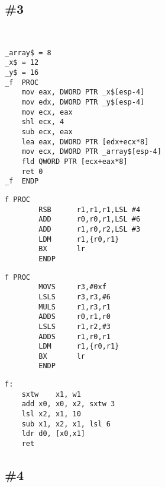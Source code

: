 \subsection{\Exercise \#3}
\label{exercise_array_3}

\WhatThisCodeDoes\


\begin{lstlisting}[caption=\Optimizing MSVC 2010]
_array$ = 8
_x$ = 12
_y$ = 16
_f	PROC
	mov	eax, DWORD PTR _x$[esp-4]
	mov	edx, DWORD PTR _y$[esp-4]
	mov	ecx, eax
	shl	ecx, 4
	sub	ecx, eax
	lea	eax, DWORD PTR [edx+ecx*8]
	mov	ecx, DWORD PTR _array$[esp-4]
	fld	QWORD PTR [ecx+eax*8]
	ret	0
_f	ENDP
\end{lstlisting}

\begin{lstlisting}[caption=\NonOptimizingKeilVI (\ARMMode)]
f PROC
        RSB      r1,r1,r1,LSL #4
        ADD      r0,r0,r1,LSL #6
        ADD      r1,r0,r2,LSL #3
        LDM      r1,{r0,r1}
        BX       lr
        ENDP
\end{lstlisting}

\begin{lstlisting}[caption=\NonOptimizingKeilVI (\ThumbMode)]
f PROC
        MOVS     r3,#0xf
        LSLS     r3,r3,#6
        MULS     r1,r3,r1
        ADDS     r0,r1,r0
        LSLS     r1,r2,#3
        ADDS     r1,r0,r1
        LDM      r1,{r0,r1}
        BX       lr
        ENDP
\end{lstlisting}

\begin{lstlisting}[caption=\Optimizing GCC 4.9 (ARM64)]
f:
	sxtw	x1, w1
	add	x0, x0, x2, sxtw 3
	lsl	x2, x1, 10
	sub	x1, x2, x1, lsl 6
	ldr	d0, [x0,x1]
	ret
\end{lstlisting}



\Answer\: 

\subsection{\Exercise \#4}
\label{exercise_array_4}

\WhatThisCodeDoes\


